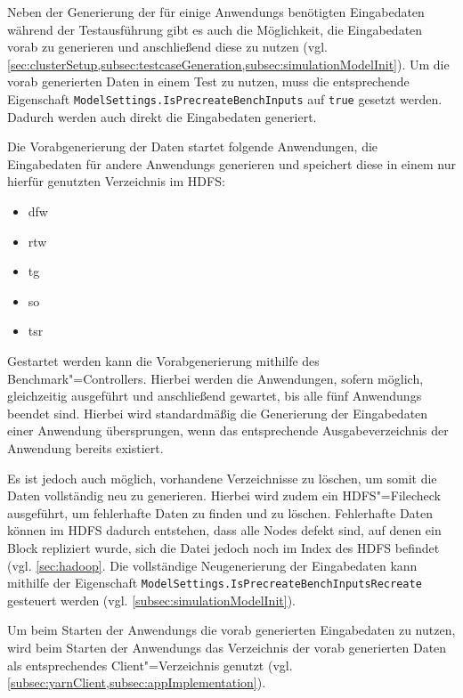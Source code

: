 Neben der Generierung der für einige \glspl{Anwendung} benötigten Eingabedaten während der Testausführung gibt es auch die Möglichkeit, die Eingabedaten vorab zu generieren und anschließend diese zu nutzen (vgl. \cref{sec:clusterSetup,subsec:testcaseGeneration,subsec:simulationModelInit}).
Um die vorab generierten Daten in einem \gls{Test} zu nutzen, muss die entsprechende Eigenschaft \texttt{ModelSettings.IsPrecreateBenchInputs} auf \texttt{true} gesetzt werden.
Dadurch werden auch direkt die Eingabedaten generiert.

Die Vorabgenerierung der Daten startet folgende Anwendungen, die Eingabedaten für andere \glspl{Anwendung} generieren und speichert diese in einem nur hierfür genutzten Verzeichnis im \gls{HDFS}:

\begin{itemize}
    \item \acrlong{dfw}
    \item \acrlong{rtw}
    \item \acrlong{tg}
    \item \acrlong{so}
    \item \acrlong{tsr}
\end{itemize}

Gestartet werden kann die Vorabgenerierung mithilfe des Benchmark"=Controllers.
Hierbei werden die Anwendungen, sofern möglich, gleichzeitig ausgeführt und anschließend gewartet, bis alle fünf \glspl{Anwendung} beendet sind.
Hierbei wird standardmäßig die Generierung der Eingabedaten einer \gls{Anwendung} übersprungen, wenn das entsprechende Ausgabeverzeichnis der \gls{Anwendung} bereits existiert.

Es ist jedoch auch möglich, vorhandene Verzeichnisse zu löschen, um somit die Daten vollständig neu zu generieren.
Hierbei wird zudem ein \gls{HDFS}"=Filecheck ausgeführt, um fehlerhafte Daten zu finden und zu löschen.
Fehlerhafte Daten können im \gls{HDFS} \zB dadurch entstehen, dass alle Nodes defekt sind, auf denen ein Block repliziert wurde, sich die Datei jedoch noch im Index des \gls{HDFS} befindet (vgl. \cref{sec:hadoop}.
Die vollständige Neugenerierung der Eingabedaten kann mithilfe der Eigenschaft \texttt{ModelSettings.IsPrecreateBenchInputsRecreate} gesteuert werden (vgl. \cref{subsec:simulationModelInit}).

Um beim Starten der \glspl{Anwendung} die vorab generierten Eingabedaten zu nutzen, wird beim Starten der \glspl{Anwendung} das Verzeichnis der vorab generierten Daten als entsprechendes Client"=Verzeichnis genutzt (vgl. \cref{subsec:yarnClient,subsec:appImplementation}).
